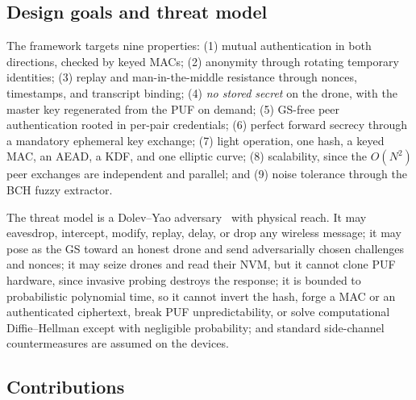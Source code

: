 \documentclass[journal]{IEEEtran}
\begin{document}
\subsection{Design goals and threat model}

The framework targets nine properties: (1) mutual authentication in both
directions, checked by keyed MACs; (2) anonymity through rotating temporary
identities; (3) replay and man-in-the-middle resistance through nonces,
timestamps, and transcript binding; (4) \emph{no stored secret} on the drone,
with the master key regenerated from the PUF on demand; (5) GS-free peer
authentication rooted in per-pair credentials; (6) perfect forward secrecy
through a mandatory ephemeral key exchange; (7) light operation, one hash, a
keyed MAC, an AEAD, a KDF, and one elliptic curve; (8) scalability, since the
$O(N^2)$ peer exchanges are independent and parallel; and (9) noise tolerance
through the BCH fuzzy extractor.

The threat model is a Dolev--Yao adversary~\cite{dolev_yao} with physical reach.
It may eavesdrop, intercept, modify, replay, delay, or drop any wireless
message; it may pose as the GS toward an honest drone and send adversarially
chosen challenges and nonces; it may seize drones and read their NVM, but it
cannot clone PUF hardware, since invasive probing destroys the response; it is
bounded to probabilistic polynomial time, so it cannot invert the hash, forge a
MAC or an authenticated ciphertext, break PUF unpredictability, or solve
computational Diffie--Hellman except with negligible probability; and standard
side-channel countermeasures are assumed on the devices.

\subsection{Contributions}
\end{document}
